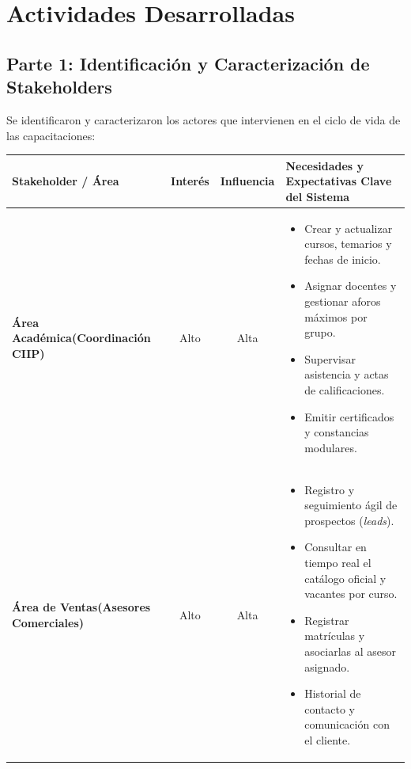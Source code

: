 \documentclass[11pt,a4paper]{article}
\begin{document}
\section{Actividades Desarrolladas}

\subsection{Parte 1: Identificación y Caracterización de Stakeholders}
Se identificaron y caracterizaron los actores que intervienen en el ciclo de vida de las capacitaciones:

\begin{table}[H]
    \centering
    \small
    \begin{tabularx}{\textwidth}{@{}p{3.5cm}ccX@{}}
        \toprule
        \textbf{Stakeholder / Área} & \textbf{Interés} & \textbf{Influencia} & \textbf{Necesidades y Expectativas Clave del Sistema} \\
        \midrule
        \textbf{Área Académica\newline(Coordinación CIIP)} & Alto & Alta & 
        \begin{itemize}[leftmargin=*,noitemsep,topsep=0pt]
            \item Crear y actualizar cursos, temarios y fechas de inicio.
            \item Asignar docentes y gestionar aforos máximos por grupo.
            \item Supervisar asistencia y actas de calificaciones.
            \item Emitir certificados y constancias modulares.
        \end{itemize} \\
        \midrule
        \textbf{Área de Ventas\newline(Asesores Comerciales)} & Alto & Alta & 
        \begin{itemize}[leftmargin=*,noitemsep,topsep=0pt]
            \item Registro y seguimiento ágil de prospectos (\textit{leads}).
            \item Consultar en tiempo real el catálogo oficial y vacantes por curso.
            \item Registrar matrículas y asociarlas al asesor asignado.
            \item Historial de contacto y comunicación con el cliente.

\end{itemize}
\end{tabularx}
\end{table}
\end{document}

